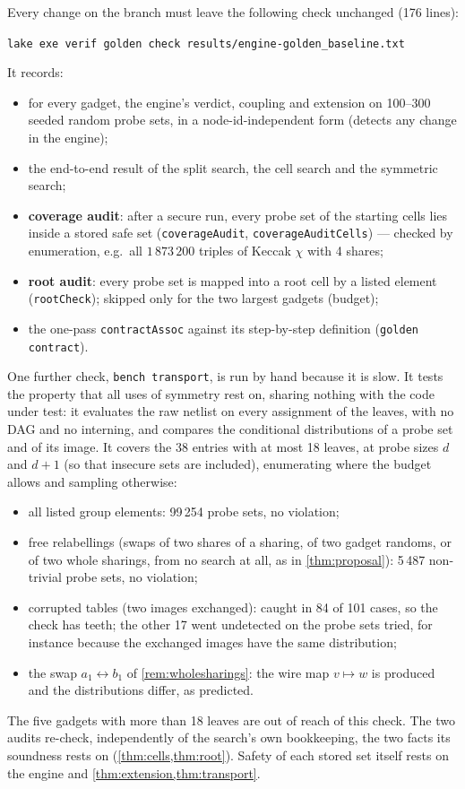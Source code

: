 \documentclass[11pt,a4paper]{article}
\theoremstyle{definition}
\theoremstyle{remark}
\newcommand{\code}[1]{\texttt{\small #1}}
\begin{document}
Every change on the branch must leave the following check unchanged (176 lines):
\begin{center}\code{lake exe verif golden check results/engine-golden\_baseline.txt}\end{center}
It records:
\begin{itemize}[leftmargin=*]
\item for every gadget, the engine's verdict, coupling and extension on 100--300 seeded
  random probe sets, in a node-id-independent form (detects any change in the engine);
\item the end-to-end result of the split search, the cell search and the symmetric search;
\item \textbf{coverage audit}: after a secure run, every probe set of the starting cells lies
  inside a stored safe set (\code{coverageAudit}, \code{coverageAuditCells}) --- checked by
  enumeration, e.g.\ all $1\,873\,200$ triples of Keccak $\chi$ with 4 shares;
\item \textbf{root audit}: every probe set is mapped into a root cell by a listed element
  (\code{rootCheck}); skipped only for the two largest gadgets (budget);
\item the one-pass \code{contractAssoc} against its step-by-step definition
  (\code{golden contract}).
\end{itemize}
One further check, \code{bench transport}, is run by hand because it is slow.  It tests the
property that all uses of symmetry rest on, sharing nothing with the code under test: it evaluates
the raw netlist on every assignment of the leaves, with no DAG and no interning, and compares the
conditional distributions of a probe set and of its image.  It covers the 38 entries with at most
18 leaves, at probe sizes $d$ and $d+1$ (so that insecure sets are included), enumerating where
the budget allows and sampling otherwise:
\begin{itemize}[leftmargin=*]
\item all listed group elements: 99\,254 probe sets, no violation;
\item free relabellings (swaps of two shares of a sharing, of two gadget randoms, or of two whole
  sharings, from no search at all, as in \cref{thm:proposal}): 5\,487 non-trivial probe sets, no
  violation;
\item corrupted tables (two images exchanged): caught in 84 of 101 cases, so the check has
  teeth; the other 17 went undetected on the probe sets tried, for instance because the exchanged
  images have the same distribution;
\item the swap $a_1\leftrightarrow b_1$ of \cref{rem:wholesharings}: the wire map
  $v\mapsto w$ is produced and the distributions differ, as predicted.
\end{itemize}
The five gadgets with more than 18 leaves are out of reach of this check.
The two audits re-check, independently of the search's own bookkeeping, the two facts its
soundness rests on (\cref{thm:cells,thm:root}).  Safety of each stored set itself rests on the
engine and \cref{thm:extension,thm:transport}.
\end{document}
